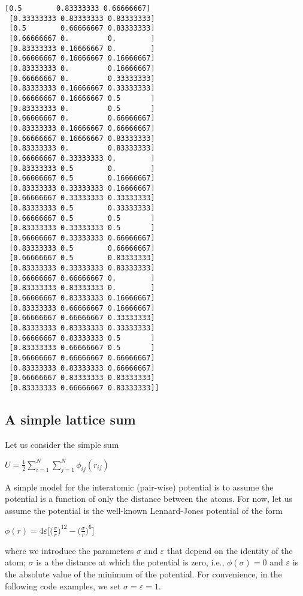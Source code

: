 \documentclass[11pt]{article}
\begin{document}
\begin{Verbatim}[commandchars=\\\{\}]
 [0.5        0.83333333 0.66666667]
 [0.33333333 0.83333333 0.83333333]
 [0.5        0.66666667 0.83333333]
 [0.66666667 0.         0.        ]
 [0.83333333 0.16666667 0.        ]
 [0.66666667 0.16666667 0.16666667]
 [0.83333333 0.         0.16666667]
 [0.66666667 0.         0.33333333]
 [0.83333333 0.16666667 0.33333333]
 [0.66666667 0.16666667 0.5       ]
 [0.83333333 0.         0.5       ]
 [0.66666667 0.         0.66666667]
 [0.83333333 0.16666667 0.66666667]
 [0.66666667 0.16666667 0.83333333]
 [0.83333333 0.         0.83333333]
 [0.66666667 0.33333333 0.        ]
 [0.83333333 0.5        0.        ]
 [0.66666667 0.5        0.16666667]
 [0.83333333 0.33333333 0.16666667]
 [0.66666667 0.33333333 0.33333333]
 [0.83333333 0.5        0.33333333]
 [0.66666667 0.5        0.5       ]
 [0.83333333 0.33333333 0.5       ]
 [0.66666667 0.33333333 0.66666667]
 [0.83333333 0.5        0.66666667]
 [0.66666667 0.5        0.83333333]
 [0.83333333 0.33333333 0.83333333]
 [0.66666667 0.66666667 0.        ]
 [0.83333333 0.83333333 0.        ]
 [0.66666667 0.83333333 0.16666667]
 [0.83333333 0.66666667 0.16666667]
 [0.66666667 0.66666667 0.33333333]
 [0.83333333 0.83333333 0.33333333]
 [0.66666667 0.83333333 0.5       ]
 [0.83333333 0.66666667 0.5       ]
 [0.66666667 0.66666667 0.66666667]
 [0.83333333 0.83333333 0.66666667]
 [0.66666667 0.83333333 0.83333333]
 [0.83333333 0.66666667 0.83333333]]
    \end{Verbatim}

    \hypertarget{a-simple-lattice-sum}{%
\subsection{A simple lattice sum}\label{a-simple-lattice-sum}}

Let us consider the simple sum

\(U = \frac{1}{2} \sum_{i=1}^N \sum_{j=1}^N \phi_{ij}(r_{ij})\)

A simple model for the interatomic (pair-wise) potential is to assume
the potential is a function of only the distance between the atoms. For
now, let us assume the potential is the well-known Lennard-Jones
potential of the form

\(\phi(r) = 4\varepsilon\Big[ \Big(\frac{\sigma}{r}\Big)^{12} - \Big(\frac{\sigma}{r}\Big)^{6}\Big]\)

where we introduce the parameters \(\sigma\) and \(\varepsilon\) that
depend on the identity of the atom; \(\sigma\) is a the distance at
which the potential is zero, i.e., \(\phi(\sigma) = 0\) and
\(\varepsilon\) is the absolute value of the minimum of the potential.
For convenience, in the following code examples, we set
\(\sigma = \varepsilon = 1\).
\end{document}
